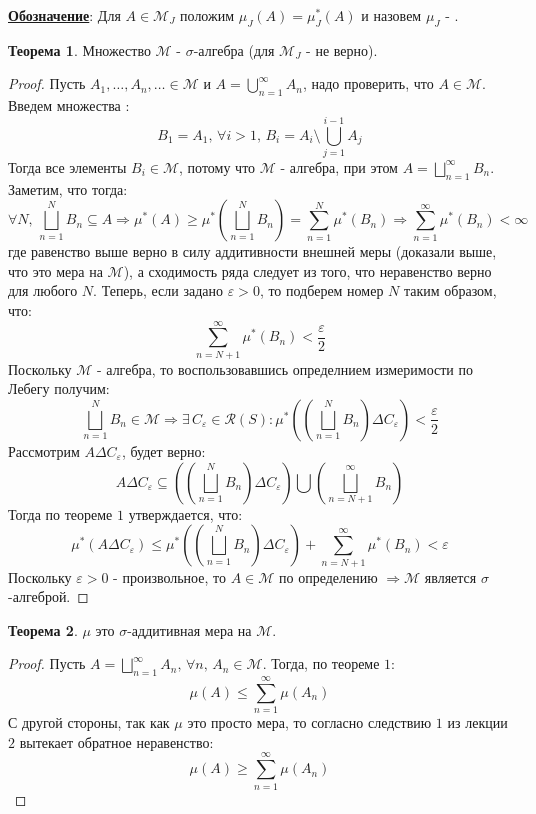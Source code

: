 \documentclass[12pt]{article}
\newcommand{\MCR}{\mathcal{R}}
\newcommand{\MM}{\mathcal{M}}
\newcommand{\VE}{\varepsilon}
\theoremstyle{definition}
\newtheorem{theorem}{Теорема}
\begin{document}
\textbf{\uline{Обозначение}}: Для $A \in \MM_J$ положим $\mu_J(A) = \mu_J^*(A)$ и назовем $\mu_J$ - .

\begin{theorem}
	Множество $\MM$ - $\sigma$-алгебра (для $\MM_J$ - не верно).
\end{theorem}
\begin{proof}
	Пусть $A_1, \dotsc, A_n, \dotsc \in \MM$ и $A = \bigcup\limits_{n = 1}^{\infty}A_n$, надо проверить, что $A \in \MM$. Введем множества :
	$$
		B_1 = A_1, \, \forall i > 1, \, B_i = A_i \setminus \bigcup\limits_{j = 1}^{i - 1}A_j
	$$
	Тогда все элементы $B_i \in \MM$, потому что $\MM$ - алгебра, при этом $A = \bigsqcup\limits_{n = 1}^{\infty}B_n$. Заметим, что тогда:
	$$
		\forall N, \, \bigsqcup\limits_{n = 1}^{N}B_n \subseteq A \Rightarrow \mu^*(A) \geq \mu^*\left( \bigsqcup\limits_{n = 1}^{N}B_n\right) = \sum\limits_{n = 1}^N \mu^*(B_n)  \Rightarrow \sum\limits_{n = 1}^{\infty} \mu^*(B_n) < \infty
	$$
	где равенство выше верно в силу аддитивности внешней меры (доказали выше, что это мера на $\MM$), а сходимость ряда следует из того, что неравенство верно для любого $N$. Теперь, если задано $\VE > 0$, то подберем номер $N$ таким образом, что:
	$$
		\sum\limits_{n = N+1}^{\infty} \mu^*(B_n) < \dfrac{\VE}{2}
	$$
	Поскольку $\MM$ - алгебра, то воспользовавшись определнием измеримости по Лебегу получим: 
	$$
		\bigsqcup\limits_{n = 1}^{N}B_n \in \MM \Rightarrow \exists \, C_\VE \in \MCR(S) \colon \mu^*\left(\left(\bigsqcup\limits_{n = 1}^{N}B_n\right)\Delta C_\VE \right) < \dfrac{\VE}{2}
	$$
	Рассмотрим $A \Delta C_\VE$, будет верно:
	$$
		A \Delta C_\VE \subseteq \left(\left(\bigsqcup\limits_{n = 1}^{N}B_n\right)\Delta C_\VE \right) \bigcup \left(\bigsqcup\limits_{n = N+ 1}^{\infty}B_n\right)
	$$
	Тогда по теореме $1$ утверждается, что:
	$$
 		\mu^*(A \Delta C_\VE) \leq \mu^*\left(\left(\bigsqcup\limits_{n = 1}^{N}B_n\right)\Delta C_\VE \right) + \sum\limits_{n = N+1}^{\infty} \mu^*(B_n) < \VE
	$$
	Поскольку $\VE > 0$ - произвольное, то $A \in \MM$ по определению  $\Rightarrow \MM$ является $\sigma$-алгеброй.
\end{proof}
\begin{theorem}
	$\mu$ это $\sigma$-аддитивная мера на $\MM$.
\end{theorem}
\begin{proof}
	Пусть $A =  \bigsqcup\limits_{n = 1}^{\infty}A_n, \, \forall n, \, A_n \in \MM$. Тогда, по теореме $1$:
	$$
		\mu(A) \leq \sum\limits_{n = 1}^{\infty}\mu(A_n)
	$$
	С другой стороны, так как $\mu$ это просто мера, то согласно следствию $1$ из лекции $2$ вытекает обратное неравенство:
	$$
		\mu(A) \geq \sum\limits_{n = 1}^{\infty}\mu(A_n)
	$$
\end{proof}
\end{document}
